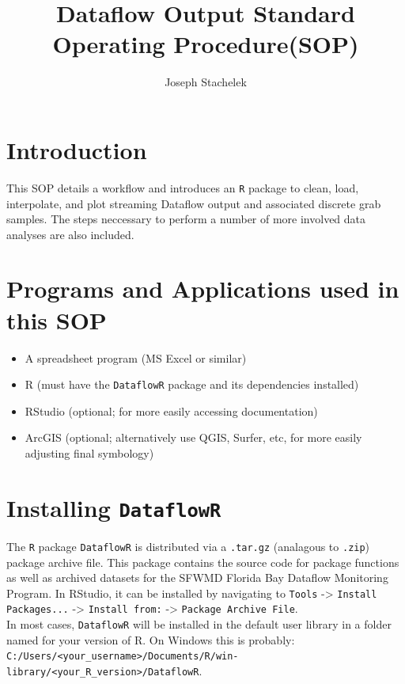 \documentclass[12pt]{article}
\author{Joseph Stachelek}
\title{Dataflow Output Standard Operating Procedure(SOP)}
\begin{document}

\maketitle
\tableofcontents
 
\newpage
\section{Introduction}

This SOP details a workflow and introduces an \texttt{R} package to clean, load, interpolate, and plot streaming Dataflow output and associated discrete grab samples. The steps neccessary to perform a number of more involved data analyses are also included.

\section{Programs and Applications used in this SOP}

\begin{itemize}
  \item A spreadsheet program (MS Excel or similar)
  \item R (must have the \texttt{DataflowR} package and its dependencies installed) 
  \item RStudio (optional; for more easily accessing documentation)
  \item ArcGIS (optional; alternatively use QGIS, Surfer, etc, for more easily adjusting final symbology)
\end{itemize}

\section{Installing \texttt{DataflowR}}

The \texttt{R} package \texttt{DataflowR} is distributed via a \texttt{.tar.gz} (analagous to \texttt{.zip}) package archive file. This package contains the source code for package functions as well as archived datasets for the SFWMD Florida Bay Dataflow Monitoring Program. In RStudio, it can be installed by navigating to \texttt{Tools} -> \texttt{Install Packages...} -> \texttt{Install from:} -> \texttt{Package Archive File}.\\ 

In most cases, \texttt{DataflowR} will be installed in the default user library in a folder named for your version of R. On Windows this is probably:\\ \texttt{C:/Users/}\verb|<your_username>|\texttt{/Documents/R/win-library/}\verb|<your_R_version>|\texttt{/DataflowR}.
\end{document}
